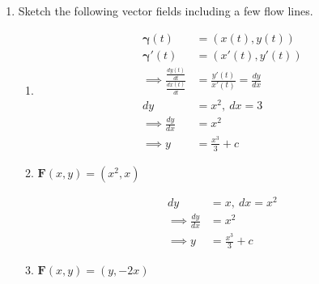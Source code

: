 \documentclass{article}
\newcommand{\gam}{\boldsymbol{\gamma}}
\begin{document}
\begin{enumerate}
\begin{enumerate}[resume]
                (see page 235, \#20)

        \end{enumerate}
        If $\gam(s)$ is a unit speed curve we can define the \textit{tortion} $\tau$ by $\frac{d \boldsymbol{B}}{ds} = - \tau \boldsymbol{N}$.
        \begin{enumerate}[resume] 
            \item Compute the torsion of $\boldsymbol{\sigma}(t) = \frac{1}{\sqrt{2}}(\cos t, \sin t)$.

                (see page 235, \#21(c))
        \end{enumerate}
    \newpage
    \item Sketch the following vector fields including a few flow lines.

    
        \begin{enumerate}
            \item
            \begin{multicols}{3}
            \begin{align*}
                \gam(t) &= (x(t), y(t)) \\
                \gam'(t) &= (x'(t), y'(t)) \\
                \implies \frac{\frac{dy(t)}{dt}}{\frac{dx(t)}{dt}} &= \frac{y'(t)}{x'(t)} =  \frac{dy}{dx} \\
                dy &= x^2, \: dx = 3 \\
                \implies \frac{dy}{dx} &= x^2 \\
                \implies y &= \frac{x^3}{3} + c
            \end{align*}
            \end{multicols}
            \item $\boldsymbol{F}(x,y) = (x^2,x)$
            \begin{multicols}{3}
            \begin{align*}
                dy &= x, \: dx = x^2 \\
                \implies \frac{dy}{dx} &= x^2 \\
                \implies y &= \frac{x^3}{3} + c
            \end{align*}
            \end{multicols}
            \item $\boldsymbol{F}(x,y) = (y,-2x)$
        \end{enumerate}


\end{enumerate}
\end{document}
